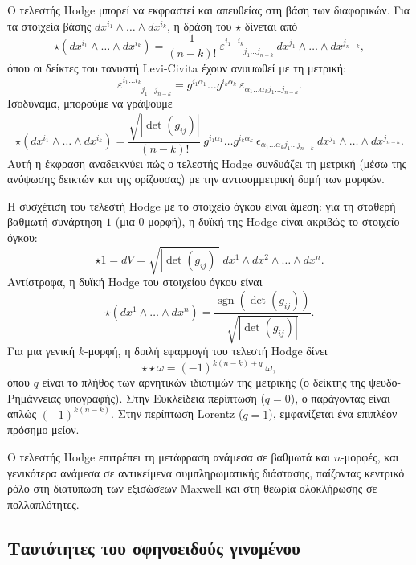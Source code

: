 \documentclass[12pt]{article}
\begin{document}
Ο τελεστής Hodge μπορεί να εκφραστεί και απευθείας στη βάση των διαφορικών. Για τα στοιχεία βάσης \( dx^{i_1} \wedge \dots \wedge dx^{i_k} \), η δράση του \( \star \) δίνεται από
\[
\star (dx^{i_1} \wedge \dots \wedge dx^{i_k}) = \frac{1}{(n-k)!} \ \varepsilon^{i_1 \dots i_k}_{\phantom{i_1 \dots i_k} j_1 \dots j_{n-k}} \ dx^{j_1} \wedge \dots \wedge dx^{j_{n-k}}, \tag{45}
\]
όπου οι δείκτες του τανυστή Levi-Civita έχουν ανυψωθεί με τη μετρική:
\[
\varepsilon^{i_1 \dots i_k}_{\phantom{i_1 \dots i_k} j_1 \dots j_{n-k}} = g^{i_1 \alpha_1} \dots g^{i_k \alpha_k} \ \varepsilon_{\alpha_1 \dots \alpha_k j_1 \dots j_{n-k}}.
\]
Ισοδύναμα, μπορούμε να γράψουμε
\[
\star (dx^{i_1} \wedge \dots \wedge dx^{i_k}) = \frac{\sqrt{|\det(g_{ij})|}}{(n-k)!} \ g^{i_1 \alpha_1} \dots g^{i_k \alpha_k} \ \epsilon_{\alpha_1 \dots \alpha_k j_1 \dots j_{n-k}} \ dx^{j_1} \wedge \dots \wedge dx^{j_{n-k}}.
\]
Αυτή η έκφραση αναδεικνύει πώς ο τελεστής Hodge συνδυάζει τη μετρική (μέσω της ανύψωσης δεικτών και της ορίζουσας) με την αντισυμμετρική δομή των μορφών.

Η συσχέτιση του τελεστή Hodge με το στοιχείο όγκου είναι άμεση: για τη σταθερή βαθμωτή συνάρτηση \( 1 \) (μια 0-μορφή), η δυϊκή της Hodge είναι ακριβώς το στοιχείο όγκου:
\[
\star 1 = dV = \sqrt{|\det(g_{ij})|} \ dx^1 \wedge dx^2 \wedge \dots \wedge dx^n.
\]
Αντίστροφα, η δυϊκή Hodge του στοιχείου όγκου είναι
\[
\star (dx^1 \wedge \dots \wedge dx^n) = \frac{\operatorname{sgn}(\det(g_{ij}))}{\sqrt{|\det(g_{ij})|}}.
\]
Για μια γενική \( k \)-μορφή, η διπλή εφαρμογή του τελεστή Hodge δίνει
\[
\star \star \omega = (-1)^{k(n-k) + q} \ \omega, \tag{46}
\]
όπου \( q \) είναι το πλήθος των αρνητικών ιδιοτιμών της μετρικής (ο δείκτης της ψευδο-Ρημάννειας υπογραφής). Στην Ευκλείδεια περίπτωση (\( q=0 \)), ο παράγοντας είναι απλώς \( (-1)^{k(n-k)} \). Στην περίπτωση Lorentz (\( q=1 \)), εμφανίζεται ένα επιπλέον πρόσημο μείον.

Ο τελεστής Hodge επιτρέπει τη μετάφραση ανάμεσα σε βαθμωτά και \( n \)-μορφές, και γενικότερα ανάμεσα σε αντικείμενα συμπληρωματικής διάστασης, παίζοντας κεντρικό ρόλο στη διατύπωση των εξισώσεων Maxwell και στη θεωρία ολοκλήρωσης σε πολλαπλότητες.

\subsection{Ταυτότητες του σφηνοειδούς γινομένου}
\end{document}
